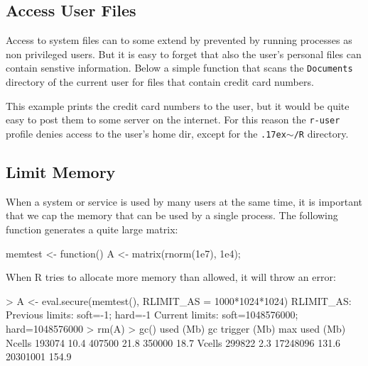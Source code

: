 \documentclass[article]{jss}
\newcommand{\R}{\textsf{R}\xspace}
\begin{document}
\begin{appendices}
\subsection{Access User Files}
\label{creditcard}

Access to system files can to some extend by prevented by running processes as
non privileged users. But it is easy to forget that also the user's personal
files can contain senstive information. Below a simple function that scans the
\texttt{Documents} directory of the current user for files that contain credit
card numbers.

\begin{CodeChunk}
\end{CodeChunk}

This example prints the credit card numbers to the user, but it would be quite
easy to post them to some server on the internet. For this reason the
\texttt{r-user} profile denies access to the user's home dir, except for the
\texttt{{\raise.17ex\hbox{$\scriptstyle\sim$}}/R} directory.


\subsection{Limit Memory}

When a system or service is used by many users at the same time, it is important
that we cap the memory that can be used by a single process. The following
function generates a quite large matrix:

\begin{CodeChunk}
\begin{CodeInput}
memtest <- function(){
	A <- matrix(rnorm(1e7), 1e4);
}
\end{CodeInput}
\end{CodeChunk}

When \R tries to allocate more memory than allowed, it will throw an error:

\begin{CodeChunk}
\begin{CodeInput}
> A <- eval.secure(memtest(), RLIMIT_AS = 1000*1024*1024)
RLIMIT_AS:
Previous limits: soft=-1; hard=-1
Current limits: soft=1048576000; hard=1048576000
> rm(A)
> gc()
         used (Mb) gc trigger  (Mb) max used  (Mb)
Ncells 193074 10.4     407500  21.8   350000  18.7
Vcells 299822  2.3   17248096 131.6 20301001 154.9



\end{CodeInput}
\end{CodeChunk}
\end{appendices}
\end{document}
